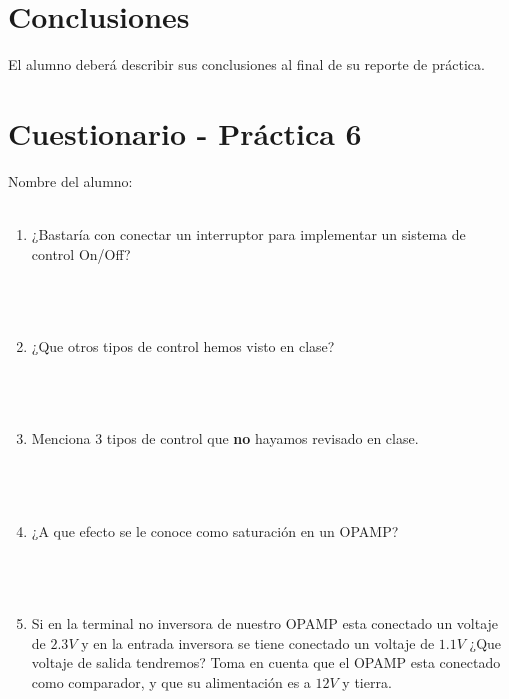 \section{Conclusiones}

	El alumno deberá describir sus conclusiones al final de su reporte de práctica.


\clearpage
\section{Cuestionario - Práctica 6}
	Nombre del alumno: \\[0.2cm]
	\horrule{0.5pt} \\[0.2cm] %

	\begin{enumerate}
		\item ¿Bastaría con conectar un interruptor para implementar un sistema de control On/Off?\\ \\ \\ \\
		\item ¿Que otros tipos de control hemos visto en clase?\\ \\ \\ \\
		\item Menciona 3 tipos de control que {\bf no} hayamos revisado en clase.\\ \\ \\ \\
		\item ¿A que efecto se le conoce como saturación en un OPAMP?\\ \\ \\ \\
		\item Si en la terminal no inversora de nuestro OPAMP esta conectado un voltaje de $2.3 V$ y en la entrada inversora se tiene conectado un voltaje de $1.1 V$ ¿Que voltaje de salida tendremos? Toma en cuenta que el OPAMP esta conectado como comparador, y que su alimentación es a $12 V$ y tierra.\\
	\end{enumerate}

